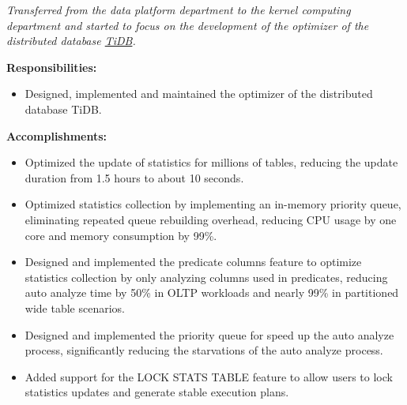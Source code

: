\documentclass{software_engineer_poe_liu}
\newcommand{\en}[1]{#1}
\newcommand{\zh}[1]{}
\begin{document}
\en{}
\zh{\datedsubsection{\textbf{\href{https://pingcap.com/zh/}{PingCAP Inc. - 数据库 - 数据库内核研发（Golang/Rust）}}}{2023/08 -- 至今}}
\en{\textsl{Transferred from the data platform department to the kernel computing department and started to focus on the development of the optimizer of the distributed database {\href{https://github.com/pingcap/tidb}{TiDB}}.}}
\zh{\textsl{从数据平台部门转组到计算内核部门，开始专注于分布式数据库 {\href{https://github.com/pingcap/tidb}{TiDB} 优化器的研发。}}}

\en{\textbf{Responsibilities:}}
\zh{\textbf{职责：}}
\begin{itemize}
      \item \en{Designed, implemented and maintained the optimizer of the distributed database TiDB.}
      \zh{设计、实现和维护分布式数据库 TiDB 的优化器。}
\end{itemize}

\en{\textbf{Accomplishments:}}
\zh{\textbf{产出：}}
\begin{itemize}
      \item \en{Optimized the update of statistics for millions of tables, reducing the update duration from 1.5 hours to about 10 seconds.}
      \zh{优化了百万张表的统计信息更新，将更新延迟从 1.5 小时缩短至约 10 秒。}
      \item \en{Optimized statistics collection by implementing an in-memory priority queue, eliminating repeated queue rebuilding overhead, reducing CPU usage by one core and memory consumption by 99\%.}
      \zh{通过实现内存中的优先级队列优化统计信息收集，消除重复队列重建开销，减少一个 CPU 核心使用率并降低 99\% 内存消耗。}
      \item \en{Designed and implemented the predicate columns feature to optimize statistics collection by only analyzing columns used in predicates, reducing auto analyze time by 50\% in OLTP workloads and nearly 99\% in partitioned wide table scenarios.}
      \zh{设计和实现了 predicate columns 功能，通过只分析谓词中使用的列来优化统计信息收集，在 OLTP 工作负载下将自动分析时间减少了 50\%，在分区宽表场景下提升近 99\%。}
      \item \en{Designed and implemented the priority queue for speed up the auto analyze process, significantly reducing the starvations of the auto analyze process.}
      \zh{设计并实现了优先级队列，加速了自动分析过程，极大的减少了自动分析过程的饥饿现象。}
      \item \en{Added support for the LOCK STATS TABLE feature to allow users to lock statistics updates and generate stable execution plans.}
      \zh{添加 LOCK STATS TABLE 功能，方便用户锁定统计信息的更新，生成稳定的执行计划。}
\end{itemize}
\end{document}
